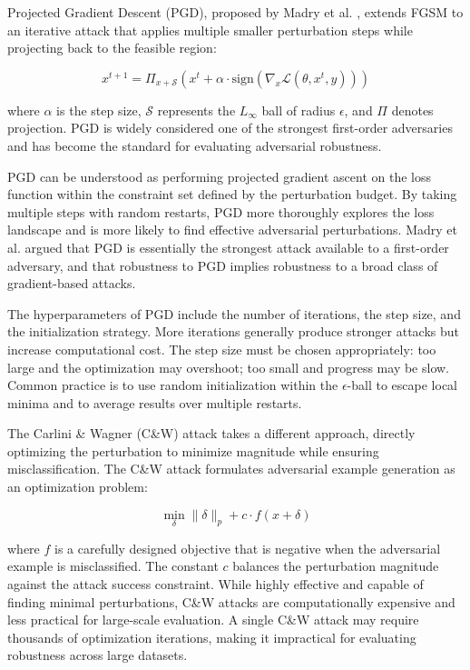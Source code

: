 \documentclass[12pt,a4paper]{article}
\begin{document}
Projected Gradient Descent (PGD), proposed by Madry et al. \cite{madry2018}, extends FGSM to an iterative attack that applies multiple smaller perturbation steps while projecting back to the feasible region:

\begin{equation}
    x^{t+1} = \Pi_{x+\mathcal{S}} \left( x^t + \alpha \cdot \text{sign}(\nabla_x \mathcal{L}(\theta, x^t, y)) \right)
\end{equation}

where $\alpha$ is the step size, $\mathcal{S}$ represents the $L_\infty$ ball of radius $\epsilon$, and $\Pi$ denotes projection. PGD is widely considered one of the strongest first-order adversaries and has become the standard for evaluating adversarial robustness.

PGD can be understood as performing projected gradient ascent on the loss function within the constraint set defined by the perturbation budget. By taking multiple steps with random restarts, PGD more thoroughly explores the loss landscape and is more likely to find effective adversarial perturbations. Madry et al. \cite{madry2018} argued that PGD is essentially the strongest attack available to a first-order adversary, and that robustness to PGD implies robustness to a broad class of gradient-based attacks.

The hyperparameters of PGD include the number of iterations, the step size, and the initialization strategy. More iterations generally produce stronger attacks but increase computational cost. The step size must be chosen appropriately: too large and the optimization may overshoot; too small and progress may be slow. Common practice is to use random initialization within the $\epsilon$-ball to escape local minima and to average results over multiple restarts.

The Carlini \& Wagner (C\&W) attack \cite{carlini2017} takes a different approach, directly optimizing the perturbation to minimize magnitude while ensuring misclassification. The C\&W attack formulates adversarial example generation as an optimization problem:

\begin{equation}
    \min_{\delta} \|\delta\|_p + c \cdot f(x + \delta)
\end{equation}

where $f$ is a carefully designed objective that is negative when the adversarial example is misclassified. The constant $c$ balances the perturbation magnitude against the attack success constraint. While highly effective and capable of finding minimal perturbations, C\&W attacks are computationally expensive and less practical for large-scale evaluation. A single C\&W attack may require thousands of optimization iterations, making it impractical for evaluating robustness across large datasets.
\end{document}
